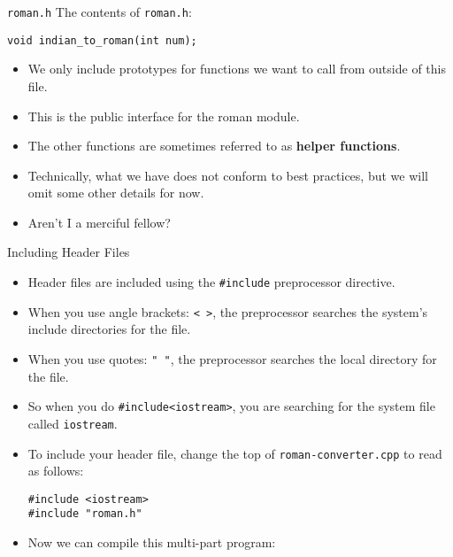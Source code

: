 \documentclass[]{beamer}
\begin{document}
\begin{frame}[fragile]{\texttt{roman.h}}
The contents of \texttt{roman.h}:
\begin{BVerbatim}
void indian_to_roman(int num);
\end{BVerbatim}
\begin{itemize}[<+(1)->]
    \item We only include prototypes for functions we want to call
        from outside of this file.
    \item This is the public interface for the roman module.
    \item The other functions are sometimes referred to as
        \textbf{helper functions}.
    \item Technically, what we have does not conform to best
        practices, but we will omit some other details for now.
    \item Aren't I a merciful fellow?
\end{itemize}
\end{frame}

\begin{frame}[fragile]{Including Header Files}
    \begin{itemize}[<+->]
        \item Header files are included using the \verb!#include!
            preprocessor directive.
        \item When you use angle brackets: \verb!< >!, the
            preprocessor searches the system's include directories for the
            file.
        \item When you use quotes: \verb!" "!, the preprocessor
            searches the local directory for the file.
        \item So when you do \verb!#include<iostream>!, you are
            searching for the system file called \texttt{iostream}.
        \item To include your header file, change the top of
        \texttt{roman-converter.cpp} to read as follows:
        \begin{BVerbatim}
#include <iostream>
#include "roman.h"
        \end{BVerbatim}
        \item Now we can compile this multi-part program:
    \end{itemize}
\end{frame}
\end{document}
